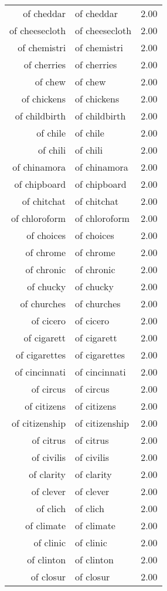 \begin{table}[ht]
\begin{tabular}{rlr}
  of cheddar & of cheddar & 2.00 \\ 
  of cheesecloth & of cheesecloth & 2.00 \\ 
  of chemistri & of chemistri & 2.00 \\ 
  of cherries & of cherries & 2.00 \\ 
  of chew & of chew & 2.00 \\ 
  of chickens & of chickens & 2.00 \\ 
  of childbirth & of childbirth & 2.00 \\ 
  of chile & of chile & 2.00 \\ 
  of chili & of chili & 2.00 \\ 
  of chinamora & of chinamora & 2.00 \\ 
  of chipboard & of chipboard & 2.00 \\ 
  of chitchat & of chitchat & 2.00 \\ 
  of chloroform & of chloroform & 2.00 \\ 
  of choices & of choices & 2.00 \\ 
  of chrome & of chrome & 2.00 \\ 
  of chronic & of chronic & 2.00 \\ 
  of chucky & of chucky & 2.00 \\ 
  of churches & of churches & 2.00 \\ 
  of cicero & of cicero & 2.00 \\ 
  of cigarett & of cigarett & 2.00 \\ 
  of cigarettes & of cigarettes & 2.00 \\ 
  of cincinnati & of cincinnati & 2.00 \\ 
  of circus & of circus & 2.00 \\ 
  of citizens & of citizens & 2.00 \\ 
  of citizenship & of citizenship & 2.00 \\ 
  of citrus & of citrus & 2.00 \\ 
  of civilis & of civilis & 2.00 \\ 
  of clarity & of clarity & 2.00 \\ 
  of clever & of clever & 2.00 \\ 
  of clich & of clich & 2.00 \\ 
  of climate & of climate & 2.00 \\ 
  of clinic & of clinic & 2.00 \\ 
  of clinton & of clinton & 2.00 \\ 
  of closur & of closur & 2.00 \\ 

\end{tabular}
\end{table}
